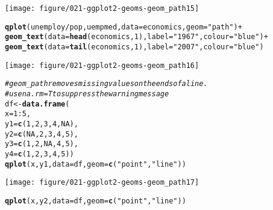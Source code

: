 \documentclass[a4paper,titlepage]{tufte-handout}\usepackage[]{graphicx}\usepackage[]{color}
\makeatletter
\def\maxwidth{ %
  \ifdim\Gin@nat@width>\linewidth
    \linewidth
  \else
    \Gin@nat@width
  \fi
}
\newcommand{\hlnum}[1]{\textcolor[rgb]{0.686,0.059,0.569}{#1}}%
\newcommand{\hlstr}[1]{\textcolor[rgb]{0.192,0.494,0.8}{#1}}%
\newcommand{\hlcom}[1]{\textcolor[rgb]{0.678,0.584,0.686}{\textit{#1}}}%
\newcommand{\hlopt}[1]{\textcolor[rgb]{0,0,0}{#1}}%
\newcommand{\hlstd}[1]{\textcolor[rgb]{0.345,0.345,0.345}{#1}}%
\newcommand{\hlkwb}[1]{\textcolor[rgb]{0.69,0.353,0.396}{#1}}%
\newcommand{\hlkwc}[1]{\textcolor[rgb]{0.333,0.667,0.333}{#1}}%
\newcommand{\hlkwd}[1]{\textcolor[rgb]{0.737,0.353,0.396}{\textbf{#1}}}%
\newenvironment{kframe}{%
 \def\at@end@of@kframe{}%
 \ifinner\ifhmode%
  \def\at@end@of@kframe{\end{minipage}}%
  \begin{minipage}{\columnwidth}%
 \fi\fi%
 \def\FrameCommand##1{\hskip\@totalleftmargin \hskip-\fboxsep
 \colorbox{shadecolor}{##1}\hskip-\fboxsep
     \hskip-\linewidth \hskip-\@totalleftmargin \hskip\columnwidth}%
 \MakeFramed {\advance\hsize-\width
   \@totalleftmargin\z@ \linewidth\hsize
   \@setminipage}}%
 {\par\unskip\endMakeFramed%
 \at@end@of@kframe}
\newenvironment{knitrout}{}{} %
\makeatother
\begin{document}
\begin{knitrout}
\texttt{[image: figure/021-ggplot2-geoms-geom\_path15]} 
\begin{kframe}\begin{alltt}
\hlkwd{qplot}\hlstd{(unemploy}\hlopt{/}\hlstd{pop, uempmed,} \hlkwc{data}\hlstd{=economics,} \hlkwc{geom}\hlstd{=}\hlstr{"path"}\hlstd{)} \hlopt{+}
  \hlkwd{geom_text}\hlstd{(}\hlkwc{data}\hlstd{=}\hlkwd{head}\hlstd{(economics,} \hlnum{1}\hlstd{),} \hlkwc{label}\hlstd{=}\hlstr{"1967"}\hlstd{,} \hlkwc{colour}\hlstd{=}\hlstr{"blue"}\hlstd{)} \hlopt{+}
  \hlkwd{geom_text}\hlstd{(}\hlkwc{data}\hlstd{=}\hlkwd{tail}\hlstd{(economics,} \hlnum{1}\hlstd{),} \hlkwc{label}\hlstd{=}\hlstr{"2007"}\hlstd{,} \hlkwc{colour}\hlstd{=}\hlstr{"blue"}\hlstd{)}
\end{alltt}
\end{kframe}
\texttt{[image: figure/021-ggplot2-geoms-geom\_path16]} 
\begin{kframe}\begin{alltt}
\hlcom{# geom_path removes missing values on the ends of a line.}
\hlcom{# use na.rm = T to suppress the warning message}
\hlstd{df} \hlkwb{<-} \hlkwd{data.frame}\hlstd{(}
  \hlkwc{x} \hlstd{=} \hlnum{1}\hlopt{:}\hlnum{5}\hlstd{,}
  \hlkwc{y1} \hlstd{=} \hlkwd{c}\hlstd{(}\hlnum{1}\hlstd{,} \hlnum{2}\hlstd{,} \hlnum{3}\hlstd{,} \hlnum{4}\hlstd{,} \hlnum{NA}\hlstd{),}
  \hlkwc{y2} \hlstd{=} \hlkwd{c}\hlstd{(}\hlnum{NA}\hlstd{,} \hlnum{2}\hlstd{,} \hlnum{3}\hlstd{,} \hlnum{4}\hlstd{,} \hlnum{5}\hlstd{),}
  \hlkwc{y3} \hlstd{=} \hlkwd{c}\hlstd{(}\hlnum{1}\hlstd{,} \hlnum{2}\hlstd{,} \hlnum{NA}\hlstd{,} \hlnum{4}\hlstd{,} \hlnum{5}\hlstd{),}
  \hlkwc{y4} \hlstd{=} \hlkwd{c}\hlstd{(}\hlnum{1}\hlstd{,} \hlnum{2}\hlstd{,} \hlnum{3}\hlstd{,} \hlnum{4}\hlstd{,} \hlnum{5}\hlstd{))}
\hlkwd{qplot}\hlstd{(x, y1,} \hlkwc{data} \hlstd{= df,} \hlkwc{geom} \hlstd{=} \hlkwd{c}\hlstd{(}\hlstr{"point"}\hlstd{,}\hlstr{"line"}\hlstd{))}
\end{alltt}


{\ttfamily\noindent\color{warningcolor}{\#\# Warning: Removed 1 rows containing missing values (geom\_point).\\\#\# Warning: Removed 1 rows containing missing values (geom\_path).}}\end{kframe}
\texttt{[image: figure/021-ggplot2-geoms-geom\_path17]} 
\begin{kframe}\begin{alltt}
\hlkwd{qplot}\hlstd{(x, y2,} \hlkwc{data} \hlstd{= df,} \hlkwc{geom} \hlstd{=} \hlkwd{c}\hlstd{(}\hlstr{"point"}\hlstd{,}\hlstr{"line"}\hlstd{))}
\end{alltt}



\end{kframe}
\end{knitrout}
\end{document}
